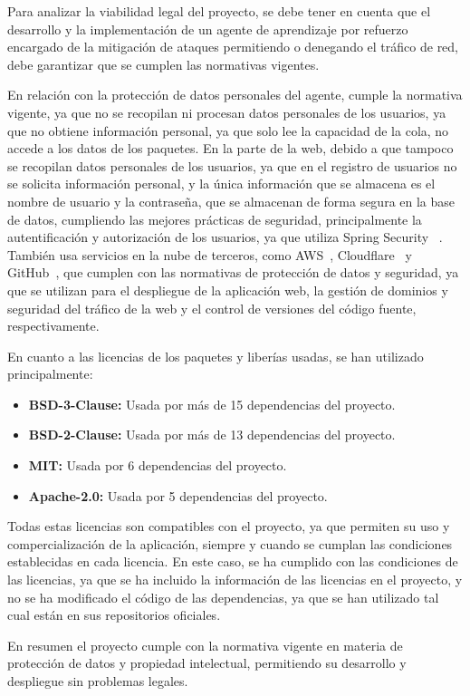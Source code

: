 Para analizar la viabilidad legal del proyecto, se debe tener en cuenta que el desarrollo y la implementación de un agente de aprendizaje por refuerzo encargado de la mitigación de ataques permitiendo o denegando el tráfico de red, debe garantizar que se cumplen las normativas vigentes.

En relación con la protección de datos personales del agente, cumple la normativa vigente, ya que no se recopilan ni procesan datos personales de los usuarios, ya que no obtiene información personal, ya que solo lee la capacidad de la cola, no accede a los datos de los paquetes. En la parte de la web, debido a que tampoco se recopilan datos personales de los usuarios, ya que en el registro de usuarios no se solicita información personal, y la única información que se almacena es el nombre de usuario y la contraseña, que se almacenan de forma segura en la base de datos, cumpliendo las mejores prácticas de seguridad, principalmente la autentificación y autorización de los usuarios, ya que utiliza Spring Security ~\cite{SpringSecurity}.
También usa servicios en la nube de terceros, como AWS~\cite{PPAWS}, Cloudflare~\cite{PPClouflare} y GitHub~\cite{PPGithub}, que cumplen con las normativas de protección de datos y seguridad, ya que se utilizan para el despliegue de la aplicación web, la gestión de dominios y seguridad del tráfico de la web y el control de versiones del código fuente, respectivamente.

En cuanto a las licencias de los paquetes y liberías usadas, se han utilizado principalmente:
\begin{itemize}
    \item \textbf{BSD-3-Clause:} Usada por más de 15 dependencias del proyecto.
    \item \textbf{BSD-2-Clause:} Usada por más de 13 dependencias del proyecto.
    \item \textbf{MIT:} Usada por 6 dependencias del proyecto.
    \item \textbf{Apache-2.0:} Usada por 5 dependencias del proyecto.
\end{itemize}
Todas estas licencias son compatibles con el proyecto, ya que permiten su uso y compercialización de la aplicación, siempre y cuando se cumplan las condiciones establecidas en cada licencia. En este caso, se ha cumplido con las condiciones de las licencias, ya que se ha incluido la información de las licencias en el proyecto, y no se ha modificado el código de las dependencias, ya que se han utilizado tal cual están en sus repositorios oficiales.


En resumen el proyecto cumple con la normativa vigente en materia de protección de datos y propiedad intelectual, permitiendo su desarrollo y despliegue sin problemas legales.